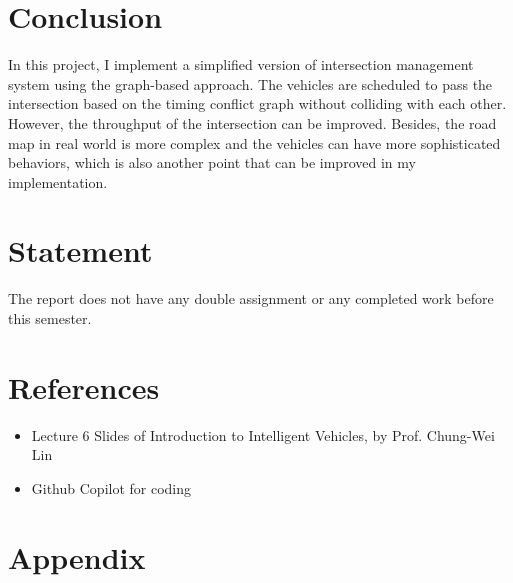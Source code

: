\documentclass{article}
\begin{document}
\begin{multicols*}{1}
    

    \section{Conclusion}
    In this project, I implement a simplified version of intersection management system using the graph-based approach. The vehicles are scheduled to pass the intersection based on the timing conflict graph without colliding with each other. However, the throughput of the intersection can be improved. Besides, the road map in real world is more complex and the vehicles can have more sophisticated behaviors, which is also another point that can be improved in my implementation.

    \section*{Statement}
    The report does not have any double assignment or any completed work before this semester.

    \section*{References}
    \begin{itemize}[itemsep=0pt, leftmargin=*]
        \item Lecture 6 Slides of Introduction to Intelligent Vehicles, by Prof. Chung-Wei Lin
        \item Github Copilot for coding
    \end{itemize}
\end{multicols*}

\newpage
\section*{Appendix}
\end{document}
